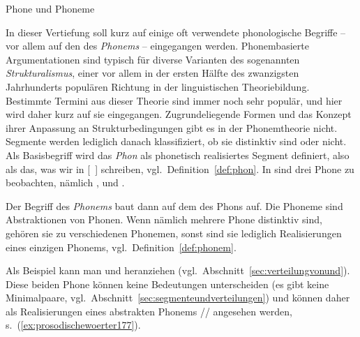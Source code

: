 
\begin{Vertiefung}{Phone und Phoneme}

\label{vert:phonephoneme}

\noindent In dieser Vertiefung soll kurz auf einige oft verwendete phonologische Begriffe -- vor allem auf den des \textit{Phonems} -- eingegangen werden.
Phonembasierte Argumentationen sind typisch für diverse Varianten des sogenannten \textit{Strukturalismus}, einer vor allem in der ersten Hälfte des zwanzigsten Jahrhunderts populären Richtung in der linguistischen Theoriebildung.
Bestimmte Termini aus dieser Theorie sind immer noch sehr populär, und hier wird daher kurz auf sie eingegangen.
Zugrundeliegende Formen und das Konzept ihrer Anpassung an Strukturbedingungen gibt es in der Phonemtheorie nicht.
Segmente werden lediglich danach klassifiziert, ob sie distinktiv sind oder nicht.
Als Basisbegriff wird das \textit{Phon} als phonetisch realisiertes Segment definiert, also als das, was wir in [~] schreiben, vgl.\ Definition~\ref{def:phon}.
In \textipa{[ta:k]} sind drei Phone zu beobachten, nämlich \textipa{[t]}, \textipa{[a:]} und \textipa{[k]}.


Der Begriff des \textit{Phonems} baut dann auf dem des Phons auf.
Die Phoneme sind Abstraktionen von Phonen.
Wenn nämlich mehrere Phone distinktiv sind, gehören sie zu verschiedenen Phonemen, sonst sind sie lediglich Realisierungen eines einzigen Phonems, vgl.\ Definition~\ref{def:phonem}.


Als Beispiel kann man \textipa{[\c{c}]} und \textipa{[X]} heranziehen (vgl.\ Abschnitt~\ref{sec:verteilungvonund}).
Diese beiden Phone können keine Bedeutungen unterscheiden (es gibt keine Minimalpaare, vgl.\ Abschnitt~\ref{sec:segmenteundverteilungen}) und können daher als Realisierungen eines abstrakten Phonems // angesehen werden, s.\ (\ref{ex:prosodischewoerter177}).


\end{Vertiefung}
